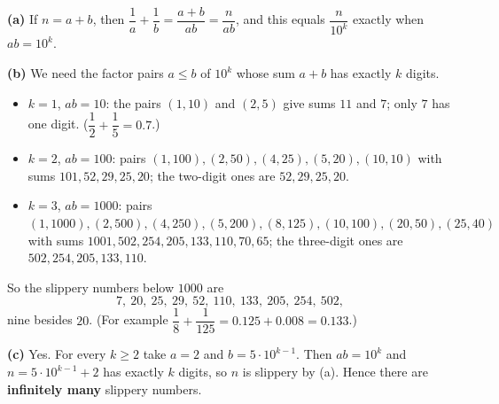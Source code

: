 \textbf{(a)} If $n=a+b$, then $\dfrac{1}{a}+\dfrac{1}{b}=\dfrac{a+b}{ab}=\dfrac{n}{ab}$, and this equals $\dfrac{n}{10^k}$ exactly when $ab=10^k$.

\textbf{(b)} We need the factor pairs $a\le b$ of $10^k$ whose sum $a+b$ has exactly $k$ digits.
\begin{itemize}
\item $k=1$, $ab=10$: the pairs $(1,10)$ and $(2,5)$ give sums $11$ and $7$; only $7$ has one digit. ($\dfrac{1}{2}+\dfrac{1}{5}=0.7$.)
\item $k=2$, $ab=100$: pairs $(1,100),(2,50),(4,25),(5,20),(10,10)$ with sums $101,52,29,25,20$; the two-digit ones are $52,29,25,20$.
\item $k=3$, $ab=1000$: pairs $(1,1000),(2,500),(4,250),(5,200),(8,125),(10,100),(20,50),(25,40)$ with sums $1001,502,254,205,133,110,70,65$; the three-digit ones are $502,254,205,133,110$.
\end{itemize}
So the slippery numbers below $1000$ are
\[
\boxed{7,\ 20,\ 25,\ 29,\ 52,\ 110,\ 133,\ 205,\ 254,\ 502},
\]
nine besides $20$. (For example $\dfrac{1}{8}+\dfrac{1}{125}=0.125+0.008=0.133$.)

\textbf{(c)} Yes. For every $k\ge2$ take $a=2$ and $b=5\cdot10^{k-1}$. Then $ab=10^k$ and $n=5\cdot10^{k-1}+2$ has exactly $k$ digits, so $n$ is slippery by (a). Hence there are \textbf{infinitely many} slippery numbers.
